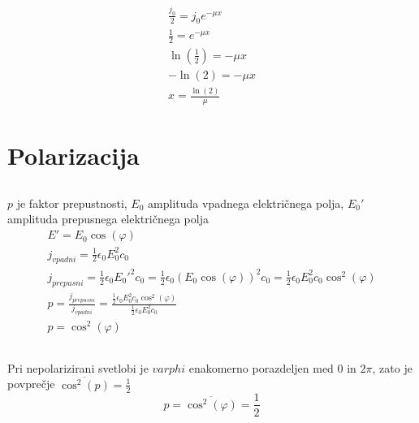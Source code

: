 \documentclass[a4paper,12pt]{article}
\begin{document}
\subsection{}
\begin{align}
    \frac{j_0}{2} = j_0 e^{-\mu x} \\
    \frac{1}{2} = e^{-\mu x} \\
    \ln\left(\frac{1}{2}\right) = -\mu x \\
    -\ln(2) = -\mu x \\
    x = \frac{\ln(2)}{\mu}
\end{align}

\newpage
\section{Polarizacija}
\subsection{}
$p$ je faktor prepustnosti, $E_0$ amplituda vpadnega električnega polja, $E_0'$ amplituda prepusnega električnega polja
\begin{align}
    E' = E_0 \cos(\varphi) \\
    j_{vpadni} = \frac{1}{2} \epsilon_0 E_0^2 c_0 \\
    j_{prepusni} = \frac{1}{2} \epsilon_0 E_0'^2 c_0 = \frac{1}{2} \epsilon_0 (E_0 \cos(\varphi))^2 c_0 = \frac{1}{2} \epsilon_0 E_0^2 c_0 \cos^2(\varphi) \\
    p = \frac{j_{prepusni}}{j_{vpadni}} = \frac{\frac{1}{2} \epsilon_0 E_0^2 c_0 \cos^2(\varphi)}{\frac{1}{2} \epsilon_0 E_0^2 c_0} \\
    p = \cos^2(\varphi)
\end{align}

\subsection{}
Pri nepolarizirani svetlobi je $varphi$ enakomerno porazdeljen med $0$ in $2 \pi$, zato je povprečje $\overline{\cos^2(p)} = \frac{1}{2}$
\begin{equation}
    p = \overline{\cos^2(\varphi)} = \frac{1}{2}
\end{equation}

\newpage
\end{document}
